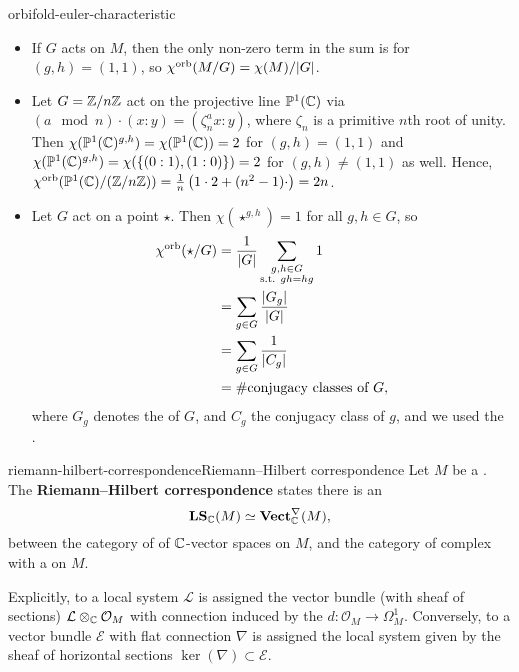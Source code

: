 \begin{example}{orbifold-euler-characteristic}
    \begin{itemize}
        \item If $G$ acts  on $M$, then the only non-zero term in the sum is for $(g, h) = (1, 1)$, so $\chi^\textup{orb}(M/G) = \chi(M) / |G|$.
        \item Let $G = \mathbb{Z}/n\mathbb{Z}$ act on the projective line $\mathbb{P}^1(\mathbb{C})$ via $(a \mod n) \cdot (x : y) = (\zeta_n^a x : y)$, where $\zeta_n$ is a primitive $n$th root of unity. Then $\chi(\mathbb{P}^1(\mathbb{C})^{g, h}) = \chi(\mathbb{P}^1(\mathbb{C})) = 2$ for $(g, h) = (1, 1)$ and $\chi(\mathbb{P}^1(\mathbb{C})^{g, h}) = \chi(\{ (0 : 1), (1 : 0) \}) = 2$ for $(g, h) \ne (1, 1)$ as well. Hence, $\chi^\textup{orb}(\mathbb{P}^1(\mathbb{C}) / (\mathbb{Z}/n\mathbb{Z})) = \frac{1}{n} \left(1 \cdot 2 + (n^2 - 1) \cdot \right) = 2n$.
        \item Let $G$ act on a point $\star$. Then $\chi(\star^{g, h}) = 1$ for all $g, h \in G$, so
        \[ \begin{aligned}
            \chi^\textup{orb}(\star / G)
                &= \frac{1}{|G|} \sum_{\substack{g, h \in G \\ \textup{s.t. } gh = hg}} 1 \\
                &= \sum_{g \in G} \frac{|G_g|}{|G|} \\
                &= \sum_{g \in G} \frac{1}{|C_g|} \\
                &= \# \textup{conjugacy classes of $G$} ,
        \end{aligned} \]
        where $G_g$ denotes the  of $G$, and $C_g$ the conjugacy class of $g$, and we used the .
    \end{itemize}
\end{example}

\begin{topic}{riemann-hilbert-correspondence}{Riemann--Hilbert correspondence}
    Let $M$ be a . The \textbf{Riemann--Hilbert correspondence} states there is an 
    \[ \textbf{LS}_{\mathbb{C}}(M) \simeq \textbf{Vect}_{\mathbb{C}}^\nabla(M) , \]
    between the category of  of $\mathbb{C}$-vector spaces on $M$, and the category of complex  with a   on $M$.
    
    Explicitly, to a local system $\mathcal{L}$ is assigned the vector bundle (with sheaf of sections) $\mathcal{L} \otimes_{\mathbb{C}} \mathcal{O}_M$ with connection induced by the  $d : \mathcal{O}_M \to \Omega_M^1$. Conversely, to a vector bundle $\mathcal{E}$ with flat connection $\nabla$ is assigned the local system given by the sheaf of horizontal sections $\ker(\nabla) \subset \mathcal{E}$.
\end{topic}

